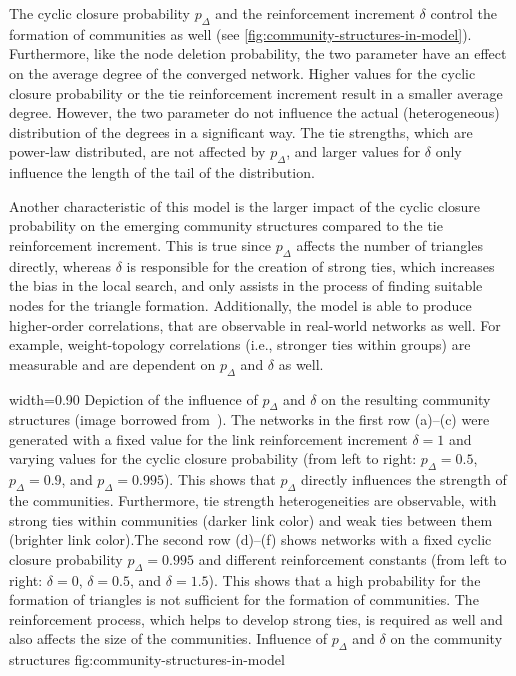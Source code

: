 The cyclic closure probability \( p_{\Delta} \) and the reinforcement increment \( \delta \) control the formation of communities as well (see \cref{fig:community-structures-in-model}).
Furthermore, like the node deletion probability, the two parameter have an effect on the average degree of the converged network.
Higher values for the cyclic closure probability or the tie reinforcement increment result in a smaller average degree.
However, the two parameter do not influence the actual (heterogeneous) distribution of the degrees in a significant way.
The tie strengths, which are power-law distributed, are not affected by \( p_{\Delta} \), and larger values for \( \delta \) only influence the length of the tail of the distribution.

Another characteristic of this model is the larger impact of the cyclic closure probability on the emerging community structures compared to the tie reinforcement increment.
This is true since \( p_{\Delta} \) affects the number of triangles directly, whereas \( \delta \) is responsible for the creation of strong ties, which increases the bias in the local search, and only assists in the process of finding suitable nodes for the triangle formation.
Additionally, the model is able to produce higher-order correlations, that are observable in real-world networks as well.
For example, weight-topology correlations (i.e., stronger ties within groups) are measurable and are dependent on \( p_{\Delta} \) and \( \delta \) as well.


      {width=0.90\textwidth}
      {Depiction of the influence of \( p_{\Delta} \) and \( \delta \) on the resulting community structures (image borrowed from~\cite{Laurent2015}). The networks in the first row (a)--(c) were generated with a fixed value for the link reinforcement increment \(\delta = 1\) and varying values for the cyclic closure probability (from left to right: \( p_{\Delta} = 0.5 \), \( p_{\Delta} = 0.9 \), and \( p_{\Delta} = 0.995 \)). This shows that \( p_{\Delta} \) directly influences the strength of the communities. Furthermore, tie strength heterogeneities are observable, with strong ties within communities (darker link color) and weak ties between them (brighter link color).The second row (d)--(f) shows networks with a fixed cyclic closure probability \( p_{\Delta} = 0.995 \) and different reinforcement constants (from left to right: \(\delta = 0\), \(\delta = 0.5\), and \(\delta = 1.5\)). This shows that a high probability for the formation of triangles is not sufficient for the formation of communities. The reinforcement process, which helps to develop strong ties, is required as well and also affects the size of the communities.}
      {Influence of \( p_{\Delta} \) and \( \delta \) on the community structures}
      {fig:community-structures-in-model}


